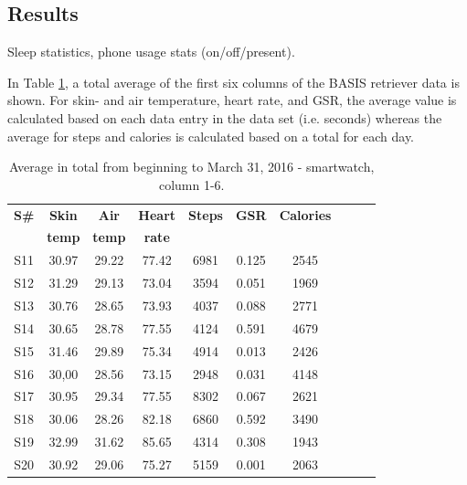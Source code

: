 \documentclass[12pt]{article} %
\begin{document}
\subsection{Results}
Sleep statistics, phone usage stats (on/off/present). 

In Table \ref{tab:averageTotal}, a total average of the first six columns of the BASIS retriever data is shown. For skin- and air temperature, heart rate, and GSR, the average value is calculated based on each data entry in the data set (i.e. seconds) whereas the average for steps and calories is calculated based on a total for each day. 

\begin{table}[H]
\center
\begin{footnotesize}
	\begin{tabular}{| c | c | c | c | c | c | c | c | c | c |}
	\hline
	\textbf{S\#} & \textbf{Skin} & \textbf{Air} & \textbf{Heart} & \textbf{Steps} & \textbf{GSR} & \textbf{Calories}\\
	 & \textbf{temp} & \textbf{temp} & \textbf{rate} & & & \\
	
	\hline
	S11 & 30.97 & 29.22 & 77.42 & 6981 & 0.125 & 2545 \\
	\hline
	S12 & 31.29 & 29.13 & 73.04 & 3594 & 0.051 & 1969 \\
	\hline
	S13 & 30.76 & 28.65 & 73.93 & 4037 & 0.088 & 2771 \\
	\hline
	S14 & 30.65 & 28.78 & 77.55 & 4124 & 0.591 & 4679 \\
	\hline
	S15 & 31.46 & 29.89 & 75.34 & 4914 & 0.013 & 2426 \\
	\hline
	S16 & 30,00 & 28.56 & 73.15 & 2948 & 0.031 & 4148 \\
	\hline
	S17 & 30.95 & 29.34 & 77.55 & 8302 & 0.067 & 2621 \\
	\hline
	S18 & 30.06 & 28.26 & 82.18 & 6860 & 0.592 & 3490 \\
	\hline
	S19 & 32.99 & 31.62 & 85.65 & 4314 & 0.308 & 1943 \\
	\hline
	S20 & 30.92 & 29.06 & 75.27 & 5159 & 0.001 & 2063 \\
	\hline
	\end{tabular}
	\caption{Average in total from beginning to March 31, 2016 - smartwatch, column 1-6.}
	\label{tab:averageTotal}
\end{footnotesize}
\end{table}
\end{document}
